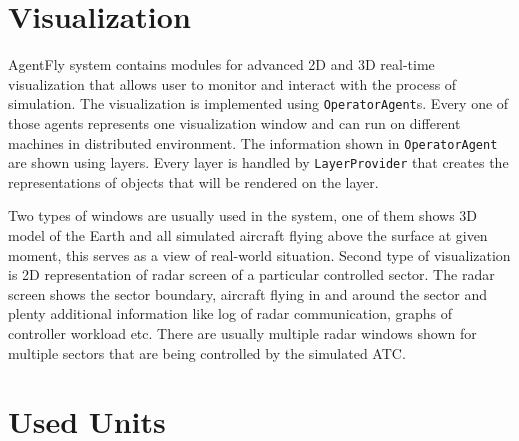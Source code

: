 \section{Visualization}
AgentFly system contains modules for advanced 2D and 3D real-time visualization that allows user to monitor and interact with the process of simulation. The visualization is 
implemented using \texttt{OperatorAgent}s. Every one of those agents represents one visualization window and can run on different machines in distributed environment. The information shown in \texttt{OperatorAgent} are shown using layers. Every layer is handled by \texttt{LayerProvider} that creates the representations of objects that will be rendered on the layer.

Two types of windows are usually used in the system, one of them shows 3D model of the Earth and all simulated aircraft flying above the surface at given moment, this serves as a view of real-world situation. Second type of visualization is 2D representation of radar screen of a particular controlled sector. The radar screen shows the sector boundary, aircraft flying in and around the sector and plenty additional information like log of radar communication, graphs of controller workload etc. There are usually multiple radar windows shown for multiple sectors that are being controlled by the simulated ATC.

\section{Used Units}
